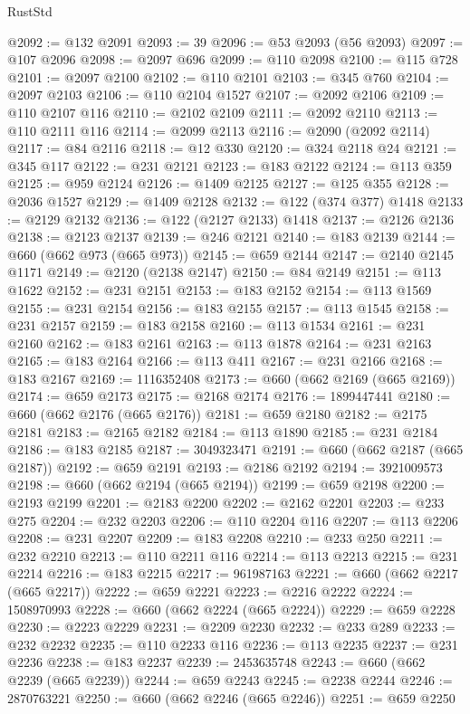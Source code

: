 \begin{lexlean}{RustStd}
\begin{coremodule}
{\begin{coremodule}
{{{{{{{{{{{{{{{{{{{{{{{{{{{{{{{{{{{{{{{{{{{{{{{@2092 := @132 @2091
@2093 := 39
@2096 := @53 @2093 (@56 @2093)
@2097 := @107 @2096
@2098 := @2097 @696
@2099 := @110 @2098
@2100 := @115 @728
@2101 := @2097 @2100
@2102 := @110 @2101
@2103 := @345 @760
@2104 := @2097 @2103
@2106 := @110 @2104 @1527
@2107 := @2092 @2106
@2109 := @110 @2107 @116
@2110 := @2102 @2109
@2111 := @2092 @2110
@2113 := @110 @2111 @116
@2114 := @2099 @2113
@2116 := @2090 (@2092 @2114)
@2117 := @84 @2116
@2118 := @12 @330
@2120 := @324 @2118 @24
@2121 := @345 @117
@2122 := @231 @2121
@2123 := @183 @2122
@2124 := @113 @359
@2125 := @959 @2124
@2126 := @1409 @2125
@2127 := @125 @355
@2128 := @2036 @1527
@2129 := @1409 @2128
@2132 := @122 (@374 @377) @1418
@2133 := @2129 @2132
@2136 := @122 (@2127 @2133) @1418
@2137 := @2126 @2136
@2138 := @2123 @2137
@2139 := @246 @2121
@2140 := @183 @2139
@2144 := @660 (@662 @973 (@665 @973))
@2145 := @659 @2144
@2147 := @2140 @2145 @1171
@2149 := @2120 (@2138 @2147)
@2150 := @84 @2149
@2151 := @113 @1622
@2152 := @231 @2151
@2153 := @183 @2152
@2154 := @113 @1569
@2155 := @231 @2154
@2156 := @183 @2155
@2157 := @113 @1545
@2158 := @231 @2157
@2159 := @183 @2158
@2160 := @113 @1534
@2161 := @231 @2160
@2162 := @183 @2161
@2163 := @113 @1878
@2164 := @231 @2163
@2165 := @183 @2164
@2166 := @113 @411
@2167 := @231 @2166
@2168 := @183 @2167
@2169 := 1116352408
@2173 := @660 (@662 @2169 (@665 @2169))
@2174 := @659 @2173
@2175 := @2168 @2174
@2176 := 1899447441
@2180 := @660 (@662 @2176 (@665 @2176))
@2181 := @659 @2180
@2182 := @2175 @2181
@2183 := @2165 @2182
@2184 := @113 @1890
@2185 := @231 @2184
@2186 := @183 @2185
@2187 := 3049323471
@2191 := @660 (@662 @2187 (@665 @2187))
@2192 := @659 @2191
@2193 := @2186 @2192
@2194 := 3921009573
@2198 := @660 (@662 @2194 (@665 @2194))
@2199 := @659 @2198
@2200 := @2193 @2199
@2201 := @2183 @2200
@2202 := @2162 @2201
@2203 := @233 @275
@2204 := @232 @2203
@2206 := @110 @2204 @116
@2207 := @113 @2206
@2208 := @231 @2207
@2209 := @183 @2208
@2210 := @233 @250
@2211 := @232 @2210
@2213 := @110 @2211 @116
@2214 := @113 @2213
@2215 := @231 @2214
@2216 := @183 @2215
@2217 := 961987163
@2221 := @660 (@662 @2217 (@665 @2217))
@2222 := @659 @2221
@2223 := @2216 @2222
@2224 := 1508970993
@2228 := @660 (@662 @2224 (@665 @2224))
@2229 := @659 @2228
@2230 := @2223 @2229
@2231 := @2209 @2230
@2232 := @233 @289
@2233 := @232 @2232
@2235 := @110 @2233 @116
@2236 := @113 @2235
@2237 := @231 @2236
@2238 := @183 @2237
@2239 := 2453635748
@2243 := @660 (@662 @2239 (@665 @2239))
@2244 := @659 @2243
@2245 := @2238 @2244
@2246 := 2870763221
@2250 := @660 (@662 @2246 (@665 @2246))
@2251 := @659 @2250
}}}}}}}}}}}}}}}}}}}}}}}}}}}}}}}}}}}}}}}}}}}}}}}
\end{coremodule}}
\end{coremodule}
\end{lexlean}
